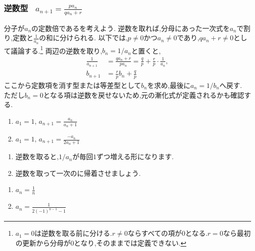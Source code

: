 
\subsubsection{\texorpdfstring{逆数型  \, $\displaystyle a_{n+1}=\frac{pa_n}{qa_n+r}$}{逆数型}}\label{節：逆数型}
    分子が$a_n$の定数倍であるを考えよう.
    逆数を取れば,分母にあった一次式を$a_n$で割り,定数と$\frac1{a_n}$の和に分けられる.
    以下では,$p\ne0$かつ$a_n\ne0$であり,$qa_n+r\ne0$として議論する.\footnote{$a_1=0$は逆数を取る前に分ける.$r\ne0$ならすべての項が$0$となる.$r=0$なら最初の更新から分母が$0$となり,そのままでは定義できない.}
    両辺の逆数を取り,$b_n=1/a_n$と置くと,
    \begin{align*}
      \frac{1}{a_{n+1}}&=\frac{qa_n+r}{pa_n}
        =\frac{q}{p}+\frac{r}{p}\cdot\frac{1}{a_n},\\
      b_{n+1}&=\frac{r}{p}b_n+\frac{q}{p}
    \end{align*}
    ここから定数項を消す型または等差型として$b_n$を求め,最後に$a_n=1/b_n$へ戻す.
    ただし$b_n=0$となる項は逆数を戻せないため,元の漸化式が定義されるかも確認する.

    \noindent {}\par\nobreak
    \begin{enumerate}[label=(\arabic*),parsep=3pt,format=\bookitemlink{example-reciprocal-1}{problem}{answer}]
      \item $\displaystyle a_1=1,\, a_{n+1}=\frac{a_n}{a_n+1}$
      \item $\displaystyle a_1=1,\, a_{n+1}=\frac{-a_n}{2a_n+1}$
    \end{enumerate}

    \noindent{}\par\nobreak
    \begin{enumerate}[label=(\arabic*),parsep=3pt,format=\bookitemlink{example-reciprocal-1}{hint}{problem}]
      \item 逆数を取ると,$1/a_n$が毎回$1$ずつ増える形になります.
      \item 逆数を取って一次のに帰着させましょう.
    \end{enumerate}

    \noindent{}\par\nobreak
    \begin{enumerate}[label=(\arabic*),parsep=3pt,format=\bookitemlink{example-reciprocal-1}{answer}{problem}]
      \item $\displaystyle a_n=\frac{1}{n}$
      \item $\displaystyle a_n=\frac{1}{2(-1)^{n-1}-1}$
    \end{enumerate}

